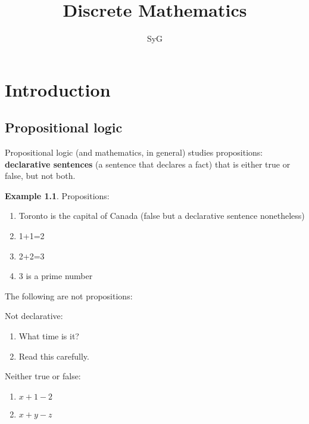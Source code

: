 \documentclass[12pt, a4paper]{book}
\begin{document}
  \theoremstyle{plain}
  \newtheorem{thm}{Theorem}[chapter]
  \newtheorem{lem}[thm]{Lemma}
  \newtheorem{prop}[thm]{Proposition}
  \newtheorem*{cor}{Corollary}
  
  
  \theoremstyle{definition}
  \newtheorem{defn}[thm]{Definition}
  \newtheorem{conj}{Conjecture}[section]
  \newtheorem{exmp}[thm]{Example}
  
  \theoremstyle{remark}
  \newtheorem*{rem}{Remark}
  \newtheorem*{note}{Note}
  
  
  \title{Discrete Mathematics}
  \author{SyG}
  \maketitle
  

\chapter{Introduction}

\section*{Propositional logic}

Propositional logic (and mathematics, in general) studies propositions: \textbf{declarative sentences} 
(a sentence that declares a fact) that is either true or false, but not both.

\begin{exmp}
    Propositions:
    \begin{enumerate}
        \item Toronto is the capital of Canada (false but a declarative sentence nonetheless)
        \item 1+1=2
        \item 2+2=3 
        \item 3 is a prime number
    \end{enumerate}
    The following are not propositions:

    Not declarative:
    \begin{enumerate}
        \item What time is it?
        \item Read this carefully.
    \end{enumerate}

    Neither true or false:

    \begin{enumerate}
        \item $x+1-2$
        \item $x+y-z$
    \end{enumerate}
\end{exmp}
\end{document}
